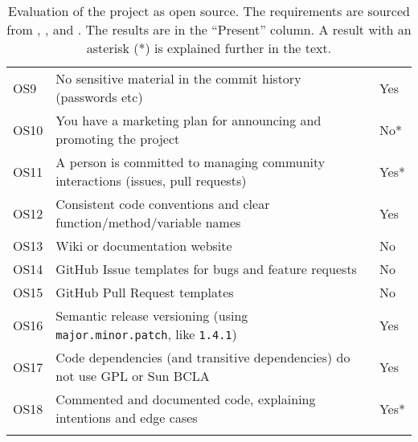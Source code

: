 \begin{longtable}{@{}lp{9cm}l@{}}
\rowcolor[HTML]{EFEFEF} 
OS9                         & No sensitive material in the commit history (passwords etc)                      & Yes  \\
OS10                        & You have a marketing plan for announcing and promoting the project               & No*  \\
\rowcolor[HTML]{EFEFEF} 
OS11                        & A person is committed to managing community interactions (issues, pull requests) & Yes* \\
OS12                        & Consistent code conventions and clear function/method/variable names             & Yes  \\
\rowcolor[HTML]{EFEFEF} 
OS13                        & Wiki or documentation website                                                    & No   \\
OS14                        & GitHub Issue templates for bugs and feature requests                             & No   \\
\rowcolor[HTML]{EFEFEF} 
OS15                        & GitHub Pull Request templates                                                    & No   \\
OS16                        & Semantic release versioning (using \texttt{major.minor.patch}, like \texttt{1.4.1})                & Yes  \\
\rowcolor[HTML]{EFEFEF} 
OS17 & Code dependencies (and transitive dependencies) do not use GPL or Sun BCLA & Yes \\
OS18                        & Commented and documented code, explaining intentions and edge cases              & Yes* \\* \bottomrule
\caption[Open Source Evaluation of the Project]{Evaluation of the project as \gls{open source}.
The requirements are sourced from \textcite{mikelinksvayerStartingOpenSource2020}, \textcite{dannyguoMakeREADME2020}, \textcite{beatonThirdPartyContent2017} and \textcite{waynebeatonEclipseProjectHandbook2020}.
The results are in the ``Present'' column.
A result with an asterisk (*) is explained further in the text.}
\label{tab:open-source-evaluation}\\
\end{longtable}